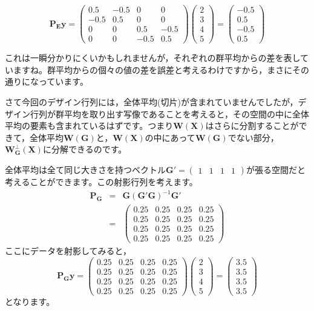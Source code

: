 \documentclass{ltjsbook}
\begin{document}
\[
	\bm{P_E}\bm{y} = \begin{pmatrix} 0.5 & -0.5 & 0 & 0 \\ -0.5 & 0.5 & 0 & 0 \\ 0 & 0 & 0.5 & -0.5 \\ 0 & 0 & -0.5 & 0.5 \end{pmatrix}
	\begin{pmatrix} 2\\3\\4\\5 \end{pmatrix} =
	\begin{pmatrix} -0.5\\0.5\\-0.5\\0.5 \end{pmatrix}
\]

これは一瞬分かりにくいかもしれませんが，それぞれの群平均からの差を表していますね。群平均からの個々の値の差を誤差と考えるわけですから，まさにその通りになっています。

さて今回のデザイン行列には，全体平均(切片)が含まれていませんでしたが，デザイン行列が群平均を取り出す写像であることを考えると，その空間の中に全体平均の要素も含まれているはずです。つまり$\bm{W(X)}$はさらに分割することができて，全体平均$\bm{W(G)}$と，$\bm{W(X)}$の中にあって$\bm{W(G)}$でない部分，$\bm{W_G^{\perp}(X)}$に分解できるのです。

全体平均は全て同じ大きさを持つベクトル$\bm{G}'=\begin{pmatrix}1 & 1 & 1 & 1\end{pmatrix}$が張る空間だと考えることができます。この射影行列を考えます。
\[
	\begin{array}{lll}
		\bm{P_G} & = & \bm{G}(\bm{G}'\bm{G})^{-1}\bm{G}'                                                                                                              \\
		         & = & \begin{pmatrix} 0.25 & 0.25 & 0.25 & 0.25 \\ 0.25 & 0.25 & 0.25 & 0.25 \\ 0.25 & 0.25 & 0.25 & 0.25 \\ 0.25 & 0.25 & 0.25 & 0.25 \end{pmatrix}
	\end{array}
\]
ここにデータを射影してみると，
\[
	\bm{P_G}\bm{y} = \begin{pmatrix} 0.25 & 0.25 & 0.25 & 0.25 \\ 0.25 & 0.25 & 0.25 & 0.25 \\ 0.25 & 0.25 & 0.25 & 0.25 \\ 0.25 & 0.25 & 0.25 & 0.25 \end{pmatrix}
	\begin{pmatrix} 2\\3\\4\\5 \end{pmatrix} =
	\begin{pmatrix} 3.5\\3.5\\3.5\\3.5 \end{pmatrix}
\]
となります。
\end{document}

